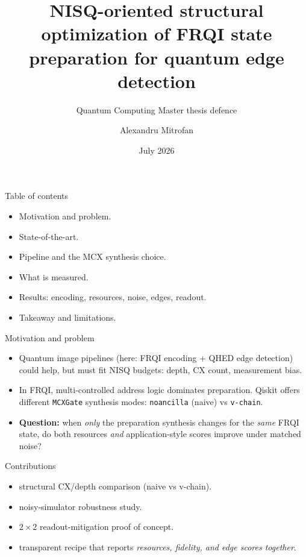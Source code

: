 \documentclass[aspectratio=169,11pt,english]{beamer}
\title[NISQ FRQI]{NISQ-oriented structural optimization of FRQI state preparation for quantum edge detection}
\subtitle{Quantum Computing Master thesis defence}
\author{Alexandru Mitrofan}
\institute{Politehnica  University of Timișoara}
\date{July 2026}
\begin{document}
\begin{frame}
  \titlepage
\end{frame}

\begin{frame}{Table of contents}
  \begin{itemize}
    \item Motivation and problem.
    \item State-of-the-art.
    \item Pipeline and the MCX synthesis choice.
    \item What is measured.
    \item Results: encoding, resources, noise, edges, readout.
    \item Takeaway and limitations.
  \end{itemize}
\end{frame}

\begin{frame}{Motivation and problem}
  \begin{itemize}
    \item Quantum image pipelines (here: FRQI encoding + QHED edge detection) could help, but must fit NISQ budgets: depth, CX count, measurement bias.
    \item In FRQI, multi-controlled address logic dominates preparation. Qiskit offers different \texttt{MCXGate} synthesis modes: \texttt{noancilla} (naive) vs \texttt{v-chain}.
    \item \textbf{Question:} when \emph{only} the preparation synthesis changes for the \emph{same} FRQI state, do both resources \emph{and} application-style scores improve under matched noise?
  \end{itemize}
\end{frame}

\begin{frame}{Contributions}
  \begin{itemize}
    \item structural CX/depth comparison (naive vs v-chain).
    \item noisy-simulator robustness study.
    \item $2\times2$ readout-mitigation proof of concept.
    \item transparent recipe that reports \emph{resources, fidelity, and edge scores together}.
  \end{itemize}
\end{frame}
\end{document}
